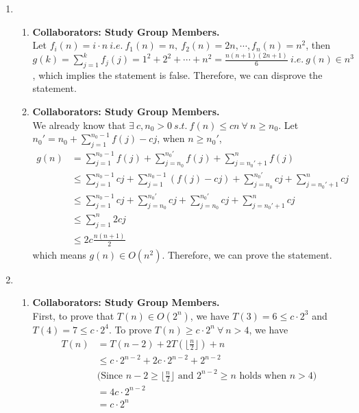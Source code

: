 \documentclass[a4paper,12pt]{article}
\begin{document}
\begin{enumerate}
\item{
\begin{enumerate}
\item { \textbf{Collaborators: Study Group Members.} \\
Let $f_i(n) = i\cdot n \ i.e. \ f_1(n) = n, \ f_2(n) = 2n, \cdots , f_n(n) = n^2$, then $g(k) = \sum _{j=1}^kf_j(j) = 1^2 + 2^2 + \cdots + n^2 = \frac{n(n+1)(2n+1)}{6} \ i.e. \ g(n) \in n^3$, which implies the statement is false. Therefore, we can disprove the statement.
}

\item { \textbf{Collaborators: Study Group Members.} \\
We already know that $\exists \ c,n_0>0 \ s.t. \ f(n)\leq cn \ \forall \ n\geq n_0$. Let $n_0' =  n_0 + \sum_{j=1}^{n_0-1}f(j)-cj$, when $n\geq n_0'$,
\[
\begin{split}
g(n) & = \sum _{j=1}^{n_0-1}f(j) + \sum _{j=n_0}^{n_0'}f(j) + \sum _{j=n_0'+1}^{n}f(j) \\ 
& \leq  \sum _{j=1}^{n_0-1}cj +  \sum _{j=1}^{n_0-1}(f(j) - cj) + \sum _{j=n_0}^{n_0'}cj + \sum _{j=n_0'+1}^{n}cj \\ 
& \leq \sum _{j=1}^{n_0-1}cj +  \sum _{j=n_0}^{n_0'}cj + \sum _{j=n_0}^{n_0'}cj + \sum _{j=n_0'+1}^{n}cj \\ 
& \leq \sum_{j=1}^n 2cj \\
& \leq 2c\frac{n(n+1)}{2}
\end{split}
\]
which means $g(n) \in O(n^2)$. Therefore, we can prove the statement.

}
\end{enumerate}
}

\item{
\begin{enumerate}
\item { \textbf{Collaborators: Study Group Members.} \\
First, to prove that $T(n) \in O(2^n)$, we have $T(3) = 6 \leq c\cdot 2^3$ and $T(4) = 7 \leq c\cdot 2^4$. To prove $T(n) \geq c\cdot 2^n \ \forall \ n > 4$, we have
\[
\begin{split}
T(n) & = T(n-2) + 2T(\lfloor \frac{n}{2} \rfloor) + n \\
& \leq c\cdot 2^{n-2} + 2c\cdot 2^{n-2} + 2^{n-2} \\
& \text{(Since $n-2 \geq \lfloor \frac{n}{2} \rfloor$ and $2^{n-2} \geq n$ holds when $n>4$)} \\
& = 4c\cdot 2^{n-2} \\
& = c\cdot 2^n
\end{split}
\]

}
\end{enumerate}}
\end{enumerate}
\end{document}
